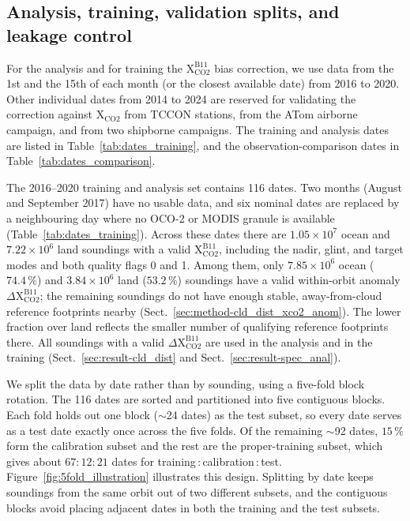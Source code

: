 \subsection{Analysis, training, validation splits, and leakage control}
\label{sec:method-daataset-split}


For the analysis and for training the $\mathrm{X_{CO2}^{B11}}$ bias correction, we use data from the 1st and the 15th of each month (or the closest available date) from 2016 to 2020. Other individual dates from 2014 to 2024 are reserved for validating the correction against $\mathrm{X_{CO2}}$ from TCCON stations, from the ATom airborne campaign, and from two shipborne campaigns. The training and analysis dates are listed in Table~\ref{tab:dates_training}, and the
observation-comparison dates in Table~\ref{tab:dates_comparison}.

The 2016--2020 training and analysis set contains 116 dates. Two months (August
and September 2017) have no usable data, and six nominal dates are replaced by a
neighbouring day where no OCO-2 or MODIS granule is available
(Table~\ref{tab:dates_training}). Across these dates there are $1.05\times10^{7}$
ocean and $7.22\times10^{6}$ land soundings with a valid
$\mathrm{X_{CO2}^{B11}}$, including the nadir, glint, and target modes and both
quality flags 0 and 1. Among them, only $7.85\times10^{6}$ ocean ($74.4\,\%$) and
$3.84\times10^{6}$ land ($53.2\,\%$) soundings have a valid within-orbit anomaly
$\Delta\mathrm{X_{CO2}^{B11}}$; the remaining soundings do not have enough stable,
away-from-cloud reference footprints nearby
(Sect.~\ref{sec:method-cld_dist_xco2_anom}). The lower fraction over land reflects
the smaller number of qualifying reference footprints there. All soundings with a
valid $\Delta\mathrm{X_{CO2}^{B11}}$ are used in the analysis and in the training
(Sect.~\ref{sec:result-cld_dist} and Sect.~\ref{sec:result-spec_anal}).

We split the data by date rather than by sounding, using a five-fold block
rotation. The 116 dates are sorted and partitioned into five contiguous blocks.
Each fold holds out one block ($\sim$24 dates) as the test subset, so every date
serves as a test date exactly once across the five folds. Of the remaining
$\sim$92 dates, $15\,\%$ form the calibration subset and the rest are the
proper-training subset, which gives about $67:12:21$ dates for
training\,:\,calibration\,:\,test. Figure~\ref{fig:5fold_illustration} illustrates
this design. Splitting by date keeps soundings from the same orbit out of two
different subsets, and the contiguous blocks avoid placing adjacent dates in both
the training and the test subsets.

